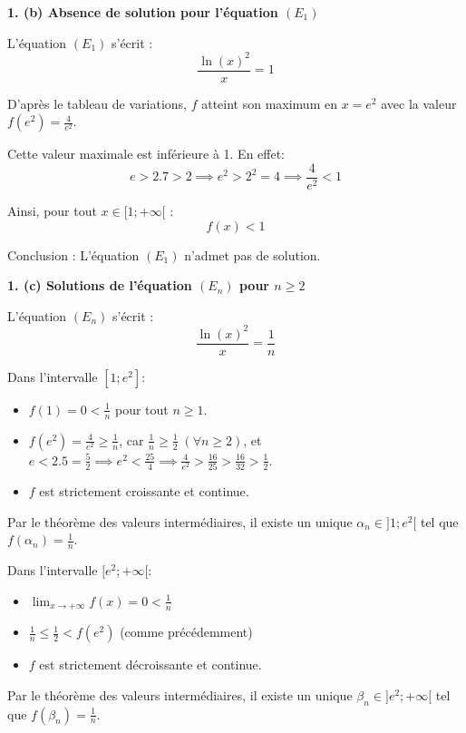 \documentclass[10pt,a4paper]{article}
\begin{document}
\bigskip
\textbf{1. (b) Absence de solution pour l'équation \( (E_1) \)}

L'équation \( (E_1) \) s'écrit :
\[
\frac{\ln(x)^2}{x} = 1
\]

D'après le tableau de variations, \( f \) atteint son maximum en \( x = e^2 \) avec la valeur \( f(e^2) =
\frac{4}{e^2} \).

Cette valeur maximale est inférieure à 1. En effet:
\[
e > 2.7 > 2 \implies e^2 > 2^2 = 4 \implies \frac{4}{e^2} < 1
\]


Ainsi, pour tout \( x \in [1; +\infty[ \) :
\[
f(x) < 1
\]

Conclusion : L'équation \( (E_1) \) n'admet pas de solution.

\bigskip
\textbf{1. (c) Solutions de l'équation \( (E_n) \) pour \( n \geq 2 \)}

L'équation \( (E_n) \) s'écrit :
\[
\frac{\ln(x)^2}{x} = \frac{1}{n}
\]

\medskip
Dans l'intervalle \( [1; e^2] \):
\begin{itemize}
\item \( f(1) = 0 < \frac{1}{n} \) pour tout \( n \geq 1 \).
\item \( f(e^2) = \frac{4}{e^2} \geq \frac{1}{n} \), car
      \( \frac{1}{n} \geq \frac{1}{2} \; (\forall n \geq 2) \),
      et \( e < 2.5 = \frac{5}{2} \implies e^2 < \frac{25}{4} \implies \frac{4}{e^2} > \frac{16}{25}
      > \frac{16}{32} > \frac{1}{2} \).
\item \( f \) est strictement croissante et continue.
\end{itemize}

Par le théorème des valeurs intermédiaires, il existe un unique \( \alpha_n \in ]1; e^2[ \) tel que \( f(\alpha_n) =
\frac{1}{n} \).

\medskip
Dans l'intervalle \( [e^2; +\infty[ \):
\begin{itemize}
\item \( \lim_{x \to +\infty} f(x) = 0 < \frac{1}{n} \)
\item \( \frac{1}{n} \leq \frac{1}{2} < f(e^2) \) (comme précédemment)
\item \( f \) est strictement décroissante et continue.
\end{itemize}

Par le théorème des valeurs intermédiaires, il existe un unique \( \beta_n \in ]e^2; +\infty[ \) tel que \( f(\beta_n) =
\frac{1}{n} \).
\end{document}
